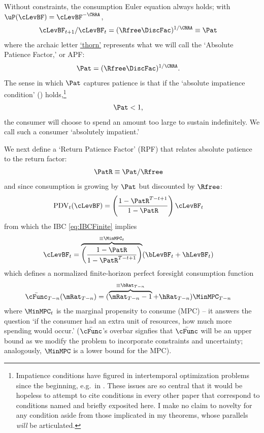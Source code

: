 \documentclass[BufferStockTheory]{subfiles}
\begin{document}
Without constraints, the consumption Euler equation always holds; with $\uP(\cLevBF)=\cLevBF^{-\CRRA}$, \hypertarget{Pat}{}
\begin{align}
  \cLevBF_{t+1}/\cLevBF_{t}  & = (\Rfree\DiscFac)^{1/\CRRA} \equiv \Pat   \label{eq:Pat}
\end{align}
where the archaic letter \href{https://en.wikipedia.org/wiki/Thorn_(letter)}{`thorn'} represents what we will call the `Absolute Patience Factor,' or APF:
\begin{align}
  \Pat & = (\Rfree\DiscFac)^{1/\CRRA} \label{eq:APF}.
\end{align}
The sense in which $\Pat$ captures patience is that if the `absolute impatience condition' (\AIC) holds,\footnote{Impatience conditions have figured in intertemporal optimization problems since the beginning, e.g.\ in \cite{ramseySave}.  These issues are so central that it would be hopeless to attempt to cite conditions in every other paper that correspond to conditions named and briefly exposited here.  I make no claim to novelty for any condition aside from those implicated in my theorems, whose parallels \textit{will} be articulated.}
\begin{align}
  \label{eq:AIC}
  \Pat  & < 1,
\end{align}
the consumer will choose to spend an amount too large to sustain indefinitely.  We call such a consumer `absolutely impatient.'\hypertarget{RPF}{}

We next define a `Return Patience Factor' (RPF) that relates absolute patience to the return factor:
\begin{align}
  \PatR  & \equiv  {\Pat}/\Rfree \label{eq:PatR}
\end{align}
and since consumption is growing by $\Pat$ but discounted by $\Rfree$:
\begin{align}
  \mathrm{PDV}_{t}(\cLevBF)  & = \left(\frac{1-\PatR^{T-t+1}}{1-\PatR}\right)\cLevBF_{t}
\end{align}
from which the IBC \eqref{eq:IBCFinite} implies
\begin{align}
  \cLevBF_{t}  & = \overbrace{\left(\frac{1-\PatR}{1-\PatR^{T-t+1}}\right)}^{\equiv \MinMPC_{t}}
                 (\bLevBF_{t}+\hLevBF_{t})   \label{eq:WDef}
\end{align}
which defines a normalized finite-horizon perfect foresight consumption function
\begin{align}
  \bar{\cFunc}_{T-n}(\mRat_{T-n})  & = (\overbrace{\mRat_{T-n}-1}^{
                                     \equiv\bRat_{T-n}}+\hRat_{T-n})\MinMPC_{T-n}
\end{align}
where $\MinMPC_{t}$ is the marginal propensity to consume (MPC) -- it answers the
question `if the consumer had an extra unit of resources, how much more spending would occur.' \hypertarget{RIC}{}
($\bar{\cFunc}$'s overbar signfies that $\bar{\cFunc}$ will be an upper bound as we modify the problem to incorporate constraints and uncertainty; analogously, $\MinMPC$ is a lower bound for the MPC).
\end{document}

